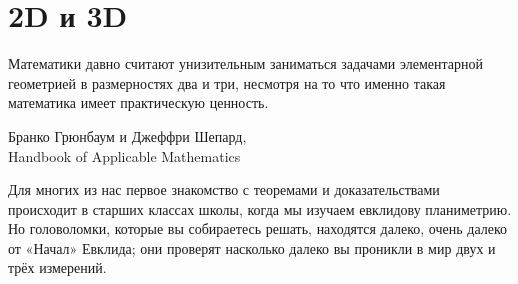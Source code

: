 \chapter{2D и 3D}

\setlength{\epigraphwidth}{.83\textwidth}
\epigraph{Математики давно считают унизительным заниматься задачами элементарной геометрией в размерностях два и три, несмотря на то что именно такая математика имеет практическую ценность.}{Бранко Грюнбаум и Джеффри Шепард,\\ Handbook of Applicable Mathematics}

Для многих из нас первое знакомство с теоремами и доказательствами происходит в старших классах школы, когда мы изучаем евклидову планиметрию.
Но головоломки, которые вы собираетесь решать, находятся далеко, очень далеко от «Начал» Евклида;
они проверят насколько далеко вы проникли в мир двух и трёх измерений.
